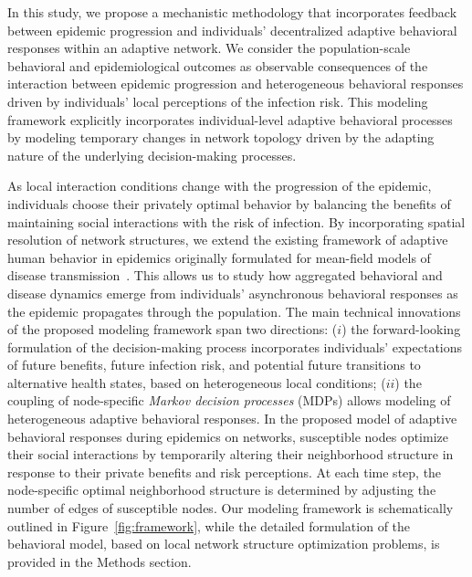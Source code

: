 \documentclass[9pt,twocolumn,twoside]{pnas-new}
\begin{document}

In this study, we propose a mechanistic methodology that incorporates feedback between epidemic progression and individuals' decentralized adaptive behavioral responses within an adaptive network.
%
We consider the population-scale behavioral and epidemiological outcomes as observable consequences of the interaction between epidemic progression and heterogeneous behavioral responses driven by individuals' local perceptions of the infection risk.
%
This modeling framework explicitly incorporates individual-level adaptive behavioral processes by modeling temporary changes in network topology driven by the adapting nature of the underlying decision-making processes. 

As local interaction conditions change with the progression of the epidemic, individuals choose their privately optimal behavior by balancing the benefits of maintaining social interactions with the risk of infection.
%
%
By incorporating spatial resolution of network structures, we extend the existing framework of adaptive human behavior in epidemics originally formulated for mean-field models of disease transmission~\cite{fenichel2011adaptive, perrings2014merging, morin2013sir, espinoza2021adaptive, espinoza2022heterogeneous,espinoza2024adaptive,espinoza2025impact}. This allows us to study how aggregated behavioral and disease dynamics emerge from individuals' asynchronous behavioral responses as the epidemic propagates through the population.
%
The main technical innovations of the proposed modeling framework span two directions:
($i$) the forward-looking formulation of the decision-making process incorporates individuals' expectations of future benefits, future infection risk, and potential future transitions to alternative health states, based on heterogeneous local conditions;
($ii$) the coupling of node-specific {\em Markov decision processes} (MDPs) allows modeling of heterogeneous adaptive behavioral responses.
%
In the proposed model of adaptive behavioral responses during epidemics on networks, susceptible nodes optimize their social interactions by temporarily altering their neighborhood structure in response to their private benefits and risk perceptions. At each time step, the node-specific optimal neighborhood structure is determined by adjusting the number of edges of susceptible nodes.
%
Our modeling framework is schematically outlined in Figure~\ref{fig:framework}, while the detailed formulation of the behavioral model, based on local network structure optimization problems, is provided in the Methods section.
\end{document}

